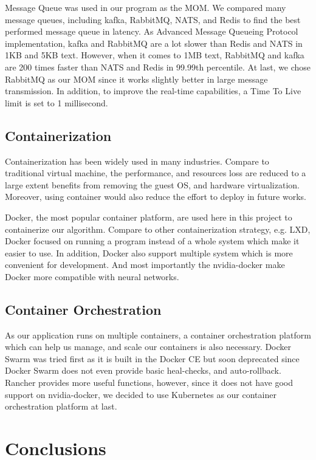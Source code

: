\documentclass[runningheads]{llncs}
\begin{document}
Message Queue was used in our program as the MOM. We 
compared many message queues, including kafka, RabbitMQ, 
NATS, and Redis to find the best performed message queue 
in latency. As Advanced Message Queueing Protocol 
implementation, kafka and RabbitMQ are a lot slower than 
Redis and NATS in 1KB and 5KB text. However, when it comes
to 1MB text, RabbitMQ and kafka are 200 times faster than 
NATS and Redis in 99.99th percentile. At last, we chose 
RabbitMQ as our MOM since it works slightly better in large 
message transmission. In addition, to improve the real-time 
capabilities, a Time To Live limit is set to 1 millisecond.


\subsection{Containerization}
Containerization has been widely used in many industries. 
Compare to traditional virtual machine, the performance, 
and resources loss are reduced to a large extent benefits 
from removing the guest OS, and hardware virtualization. 
Moreover, using container would also reduce the effort to 
deploy in future works. 

Docker, the most popular container platform, are used here 
in this project to containerize our algorithm. Compare to 
other containerization strategy, e.g. LXD, Docker focused 
on running a program instead of a whole system which make 
it easier to use. In addition, Docker also support multiple 
system which is more convenient for development. And most 
importantly the nvidia-docker make Docker more compatible 
with neural networks.

\subsection{Container Orchestration}
As our application runs on multiple containers, a container 
orchestration platform which can help us manage, and scale 
our containers is also necessary. Docker Swarm was tried 
first as it is built in the Docker CE but soon deprecated 
since Docker Swarm does not even provide basic heal-checks, 
and auto-rollback. Rancher provides more useful functions, 
however, since it does not have good support on 
nvidia-docker, we decided to use Kubernetes as our 
container orchestration platform at last.


\section{Conclusions}


\clearpage



\end{document}
